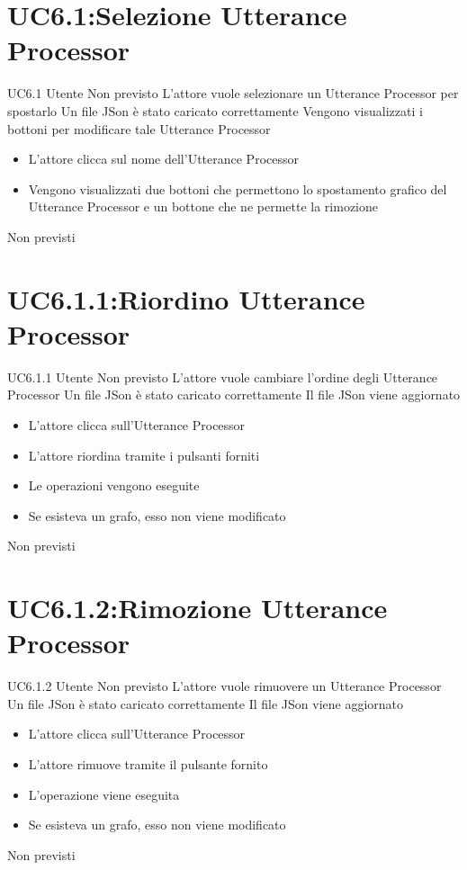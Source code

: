 \documentclass[../AnalisideiRequisiti.tex]{subfiles}
\begin{document}
\section{UC6.1:Selezione Utterance Processor}
\UserCase
{UC6.1}
{Utente}
{Non previsto}
{L'attore vuole selezionare un Utterance Processor per spostarlo}
{Un file JSon è stato caricato correttamente }
{Vengono visualizzati i bottoni per modificare tale Utterance Processor}
{
	\begin{itemize}
		\item{} L'attore clicca sul nome dell'Utterance Processor
		\item{} Vengono visualizzati due bottoni che permettono lo spostamento grafico del Utterance Processor  e un bottone che ne permette la rimozione  		
	\end{itemize}
}
{Non previsti}

\section{UC6.1.1:Riordino Utterance Processor}
\UserCase
{UC6.1.1}
{Utente}
{Non previsto}
{L'attore vuole cambiare l'ordine degli Utterance Processor}
{Un file JSon è stato caricato correttamente }
{Il file JSon viene aggiornato}
{
	\begin{itemize}
		\item{} L'attore clicca sull'Utterance Processor 
		\item{} L'attore riordina tramite i pulsanti forniti	
		\item{} Le operazioni vengono eseguite
		\item{} Se esisteva un grafo, esso non viene modificato
		
	\end{itemize}
}
{Non previsti}

\section{UC6.1.2:Rimozione Utterance Processor}
\UserCase
{UC6.1.2}
{Utente}
{Non previsto}
{L'attore vuole rimuovere un Utterance Processor}
{Un file JSon è stato caricato  correttamente }
{Il file JSon viene aggiornato}
{
	\begin{itemize}
		\item{} L'attore clicca sull'Utterance Processor 
		\item{} L'attore rimuove tramite il pulsante fornito	
		\item{} L'operazione viene eseguita
		\item{} Se esisteva un grafo, esso non viene modificato
		
	\end{itemize}
}
{Non previsti}
\end{document}
